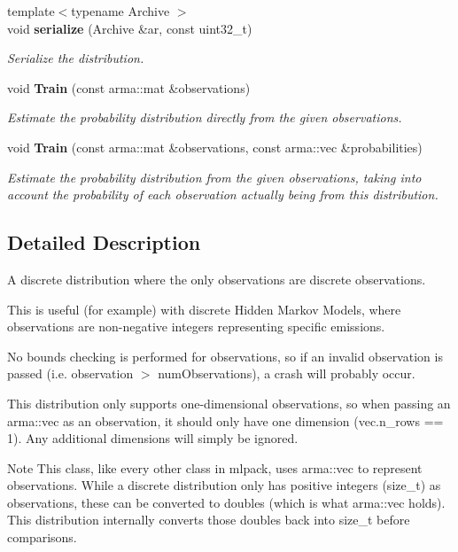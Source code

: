 \begin{DoxyCompactItemize}
{\footnotesize template$<$typename Archive $>$ }\\void \textbf{ serialize} (Archive \&ar, const uint32\+\_\+t)
\begin{DoxyCompactList}\small\item\em Serialize the distribution. \end{DoxyCompactList}\item 
void \textbf{ Train} (const arma\+::mat \&observations)
\begin{DoxyCompactList}\small\item\em Estimate the probability distribution directly from the given observations. \end{DoxyCompactList}\item 
void \textbf{ Train} (const arma\+::mat \&observations, const arma\+::vec \&probabilities)
\begin{DoxyCompactList}\small\item\em Estimate the probability distribution from the given observations, taking into account the probability of each observation actually being from this distribution. \end{DoxyCompactList}\end{DoxyCompactItemize}


\subsection{Detailed Description}
A discrete distribution where the only observations are discrete observations. 

This is useful (for example) with discrete Hidden Markov Models, where observations are non-\/negative integers representing specific emissions.

No bounds checking is performed for observations, so if an invalid observation is passed (i.\+e. observation $>$ num\+Observations), a crash will probably occur.

This distribution only supports one-\/dimensional observations, so when passing an arma\+::vec as an observation, it should only have one dimension (vec.\+n\+\_\+rows == 1). Any additional dimensions will simply be ignored.

\begin{DoxyNote}{Note}
This class, like every other class in mlpack, uses arma\+::vec to represent observations. While a discrete distribution only has positive integers (size\+\_\+t) as observations, these can be converted to doubles (which is what arma\+::vec holds). This distribution internally converts those doubles back into size\+\_\+t before comparisons. 
\end{DoxyNote}


